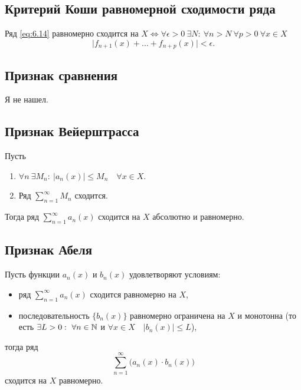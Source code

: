 \subsection{Критерий Коши равномерной сходимости ряда}

\begin{theorem}
    Ряд \ref{eq:6.14} равномерно сходится на $X \iff \forall \epsilon > 0 \ \exists N: \ \forall n > N \ \forall p > 0 \ \forall x \in X$
    \[
        \big|f_{n+1}(x) + \ldots + f_{n+p}(x)\big| < \epsilon.
    \]
\end{theorem}

\subsection{Признак сравнения}

Я не нашел.

\subsection{Признак Вейерштрасса}

\begin{corollary}
    Пусть
    \begin{enumerate}
        \item $\forall n \ \exists M_n: \ \big|a_n(x)\big| \leqslant M_n \quad \forall x \in X $.
        \item Ряд $\sum_{n=1}^{\infty} M_n$ сходится.
    \end{enumerate}

    Тогда ряд $\sum_{n=1}^{\infty}a_n(x)$ сходится на $X$ абсолютно и равномерно.
\end{corollary}

\newpage

\subsection{Признак Абеля}

\begin{theorem}\label{theorem:6.9.1}
    Пусть функции $a_n(x)$ и $b_n(x)$ удовлетворяют условиям:
    \begin{itemize}
        \item ряд $\sum_{n=1}^{\infty}a_n(x)$ сходится равномерно на $X$,
        \item последовательность $\big\{b_n(x)\big\}$ равномерно ограничена на $X$ и монотонна (то есть $\exists L > 0: \ \forall n \in \N$ и $\forall x \in X \quad \big|b_n(x)\big| \leqslant L$),
    \end{itemize}
    тогда ряд
    \[
        \sum_{n=1}^{\infty}\big(a_n(x) \cdot b_n(x)\big)
    \]
    сходится на $X$ равномерно.

\end{theorem}

